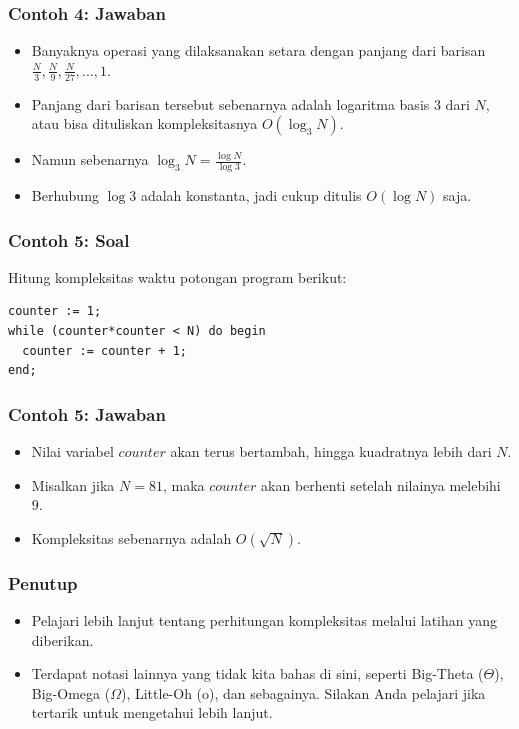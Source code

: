 \documentclass{beamer}
\begin{document}
\begin{frame}
\frametitle{Contoh 4: Jawaban}
\begin{itemize}
    \item Banyaknya operasi yang dilaksanakan setara dengan panjang dari barisan $\frac{N}{3}, \frac{N}{9}, \frac{N}{27}, ..., 1$.
    \item Panjang dari barisan tersebut sebenarnya adalah logaritma basis 3 dari $N$, atau bisa dituliskan kompleksitasnya $O(\log_3{N})$.
    \item Namun sebenarnya $\log_3{N} = \frac{\log{N}}{\log{3}}$.
    \item Berhubung $\log{3}$ adalah konstanta, jadi cukup ditulis $O(\log{N})$ saja.
\end{itemize}
\end{frame}

\begin{frame}[fragile]
\frametitle{Contoh 5: Soal}
Hitung kompleksitas waktu potongan program berikut:

\hfill

\begin{lstlisting}
counter := 1;
while (counter*counter < N) do begin
  counter := counter + 1;
end;
\end{lstlisting}
\end{frame}

\begin{frame}
\frametitle{Contoh 5: Jawaban}
\begin{itemize}
    \item Nilai variabel $counter$ akan terus bertambah, hingga kuadratnya lebih dari $N$.
    \item Misalkan jika $N = 81$, maka $counter$ akan berhenti setelah nilainya melebihi $9$.
    \item Kompleksitas sebenarnya adalah $O(\sqrt{N})$.
\end{itemize}
\end{frame}

\begin{frame}
\frametitle{Penutup}
\begin{itemize}
    \item Pelajari lebih lanjut tentang perhitungan kompleksitas melalui latihan yang diberikan.
    \item Terdapat notasi lainnya yang tidak kita bahas di sini, seperti Big-Theta ($\Theta$), Big-Omega ($\Omega$), Little-Oh (o), dan sebagainya. Silakan Anda pelajari jika tertarik untuk mengetahui lebih lanjut.
\end{itemize}
\end{frame}
\end{document}
